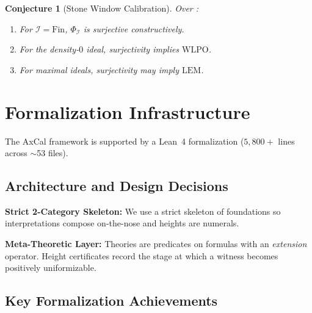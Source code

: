 \documentclass[11pt]{article}
\newtheorem{conjecture}[theorem]{Conjecture}
\newcommand{\WLPO}{\mathrm{WLPO}}
\newcommand{\LEM}{\mathrm{LEM}}
\newcommand{\BISH}{\mathrm{BISH}}
\begin{document}
\begin{conjecture}[Stone Window Calibration]\label{conj:stone-calibration}
Over \BISH:
\begin{enumerate}
\item For $\mathcal{I}=\mathrm{Fin}$, $\Phi_{\mathcal{I}}$ is surjective constructively.
\item For the density-$0$ ideal, surjectivity implies $\WLPO$.
\item For maximal ideals, surjectivity may imply $\LEM$.
\end{enumerate}
\end{conjecture}

\section{Formalization Infrastructure}

The AxCal framework is supported by a Lean~4 formalization ($5{,}800+$ lines across $\sim$53 files).

\subsection{Architecture and Design Decisions}

\textbf{Strict 2-Category Skeleton:} We use a strict skeleton of foundations so interpretations compose on-the-nose and heights are numerals.

\textbf{Meta-Theoretic Layer:} Theories are predicates on formulas with an \emph{extension} operator. Height certificates record the stage at which a witness becomes positively uniformizable.

\subsection{Key Formalization Achievements}
\end{document}
